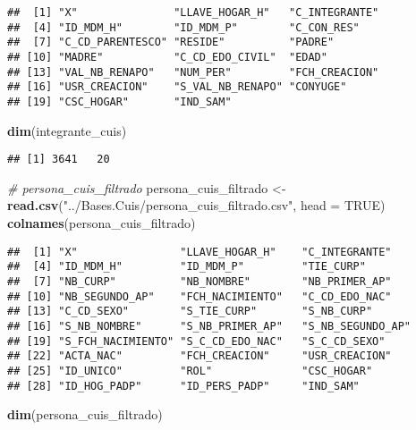 \documentclass[11pt,]{article}
\newenvironment{Shaded}{\begin{snugshade}}{\end{snugshade}}
\newcommand{\KeywordTok}[1]{\textcolor[rgb]{0.13,0.29,0.53}{\textbf{#1}}}
\newcommand{\DataTypeTok}[1]{\textcolor[rgb]{0.13,0.29,0.53}{#1}}
\newcommand{\StringTok}[1]{\textcolor[rgb]{0.31,0.60,0.02}{#1}}
\newcommand{\CommentTok}[1]{\textcolor[rgb]{0.56,0.35,0.01}{\textit{#1}}}
\newcommand{\OtherTok}[1]{\textcolor[rgb]{0.56,0.35,0.01}{#1}}
\newcommand{\NormalTok}[1]{#1}
\begin{document}
\begin{verbatim}
##  [1] "X"               "LLAVE_HOGAR_H"   "C_INTEGRANTE"   
##  [4] "ID_MDM_H"        "ID_MDM_P"        "C_CON_RES"      
##  [7] "C_CD_PARENTESCO" "RESIDE"          "PADRE"          
## [10] "MADRE"           "C_CD_EDO_CIVIL"  "EDAD"           
## [13] "VAL_NB_RENAPO"   "NUM_PER"         "FCH_CREACION"   
## [16] "USR_CREACION"    "S_VAL_NB_RENAPO" "CONYUGE"        
## [19] "CSC_HOGAR"       "IND_SAM"
\end{verbatim}

\begin{Shaded}
\begin{Highlighting}[]
\KeywordTok{dim}\NormalTok{(integrante_cuis)}
\end{Highlighting}
\end{Shaded}

\begin{verbatim}
## [1] 3641   20
\end{verbatim}

\begin{Shaded}
\begin{Highlighting}[]
\CommentTok{# persona_cuis_filtrado}
\NormalTok{persona_cuis_filtrado <-}\StringTok{ }\KeywordTok{read.csv}\NormalTok{(}\StringTok{"../Bases.Cuis/persona_cuis_filtrado.csv"}\NormalTok{, }\DataTypeTok{head =} \OtherTok{TRUE}\NormalTok{)}
\KeywordTok{colnames}\NormalTok{(persona_cuis_filtrado)}
\end{Highlighting}
\end{Shaded}

\begin{verbatim}
##  [1] "X"                "LLAVE_HOGAR_H"    "C_INTEGRANTE"    
##  [4] "ID_MDM_H"         "ID_MDM_P"         "TIE_CURP"        
##  [7] "NB_CURP"          "NB_NOMBRE"        "NB_PRIMER_AP"    
## [10] "NB_SEGUNDO_AP"    "FCH_NACIMIENTO"   "C_CD_EDO_NAC"    
## [13] "C_CD_SEXO"        "S_TIE_CURP"       "S_NB_CURP"       
## [16] "S_NB_NOMBRE"      "S_NB_PRIMER_AP"   "S_NB_SEGUNDO_AP" 
## [19] "S_FCH_NACIMIENTO" "S_C_CD_EDO_NAC"   "S_C_CD_SEXO"     
## [22] "ACTA_NAC"         "FCH_CREACION"     "USR_CREACION"    
## [25] "ID_UNICO"         "ROL"              "CSC_HOGAR"       
## [28] "ID_HOG_PADP"      "ID_PERS_PADP"     "IND_SAM"
\end{verbatim}

\begin{Shaded}
\begin{Highlighting}[]
\KeywordTok{dim}\NormalTok{(persona_cuis_filtrado)}
\end{Highlighting}
\end{Shaded}
\end{document}

